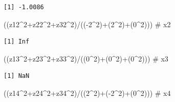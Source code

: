 \documentclass[
  letterpaper,
  DIV=11,
  numbers=noendperiod]{scrartcl}
\newenvironment{Shaded}{\begin{snugshade}}{\end{snugshade}}
\newcommand{\CommentTok}[1]{\textcolor[rgb]{0.37,0.37,0.37}{#1}}
\newcommand{\DecValTok}[1]{\textcolor[rgb]{0.68,0.00,0.00}{#1}}
\newcommand{\NormalTok}[1]{\textcolor[rgb]{0.00,0.23,0.31}{#1}}
\newcommand{\SpecialCharTok}[1]{\textcolor[rgb]{0.37,0.37,0.37}{#1}}
\begin{document}
\begin{verbatim}
[1] -1.0086
\end{verbatim}

\begin{Shaded}
\begin{Highlighting}[]
\NormalTok{((z12}\SpecialCharTok{\^{}}\DecValTok{2}\SpecialCharTok{+}\NormalTok{z22}\SpecialCharTok{\^{}}\DecValTok{2}\SpecialCharTok{+}\NormalTok{z32}\SpecialCharTok{\^{}}\DecValTok{2}\NormalTok{)}\SpecialCharTok{/}\NormalTok{((}\SpecialCharTok{{-}}\DecValTok{2}\SpecialCharTok{\^{}}\DecValTok{2}\NormalTok{)}\SpecialCharTok{+}\NormalTok{(}\DecValTok{2}\SpecialCharTok{\^{}}\DecValTok{2}\NormalTok{)}\SpecialCharTok{+}\NormalTok{(}\DecValTok{0}\SpecialCharTok{\^{}}\DecValTok{2}\NormalTok{))) }\CommentTok{\# x2}
\end{Highlighting}
\end{Shaded}

\begin{verbatim}
[1] Inf
\end{verbatim}

\begin{Shaded}
\begin{Highlighting}[]
\NormalTok{((z13}\SpecialCharTok{\^{}}\DecValTok{2}\SpecialCharTok{+}\NormalTok{z23}\SpecialCharTok{\^{}}\DecValTok{2}\SpecialCharTok{+}\NormalTok{z33}\SpecialCharTok{\^{}}\DecValTok{2}\NormalTok{)}\SpecialCharTok{/}\NormalTok{((}\DecValTok{0}\SpecialCharTok{\^{}}\DecValTok{2}\NormalTok{)}\SpecialCharTok{+}\NormalTok{(}\DecValTok{0}\SpecialCharTok{\^{}}\DecValTok{2}\NormalTok{)}\SpecialCharTok{+}\NormalTok{(}\DecValTok{0}\SpecialCharTok{\^{}}\DecValTok{2}\NormalTok{))) }\CommentTok{\# x3}
\end{Highlighting}
\end{Shaded}

\begin{verbatim}
[1] NaN
\end{verbatim}

\begin{Shaded}
\begin{Highlighting}[]
\NormalTok{((z14}\SpecialCharTok{\^{}}\DecValTok{2}\SpecialCharTok{+}\NormalTok{z24}\SpecialCharTok{\^{}}\DecValTok{2}\SpecialCharTok{+}\NormalTok{z34}\SpecialCharTok{\^{}}\DecValTok{2}\NormalTok{)}\SpecialCharTok{/}\NormalTok{((}\DecValTok{2}\SpecialCharTok{\^{}}\DecValTok{2}\NormalTok{)}\SpecialCharTok{+}\NormalTok{(}\SpecialCharTok{{-}}\DecValTok{2}\SpecialCharTok{\^{}}\DecValTok{2}\NormalTok{)}\SpecialCharTok{+}\NormalTok{(}\DecValTok{0}\SpecialCharTok{\^{}}\DecValTok{2}\NormalTok{))) }\CommentTok{\# x4}
\end{Highlighting}
\end{Shaded}
\end{document}

